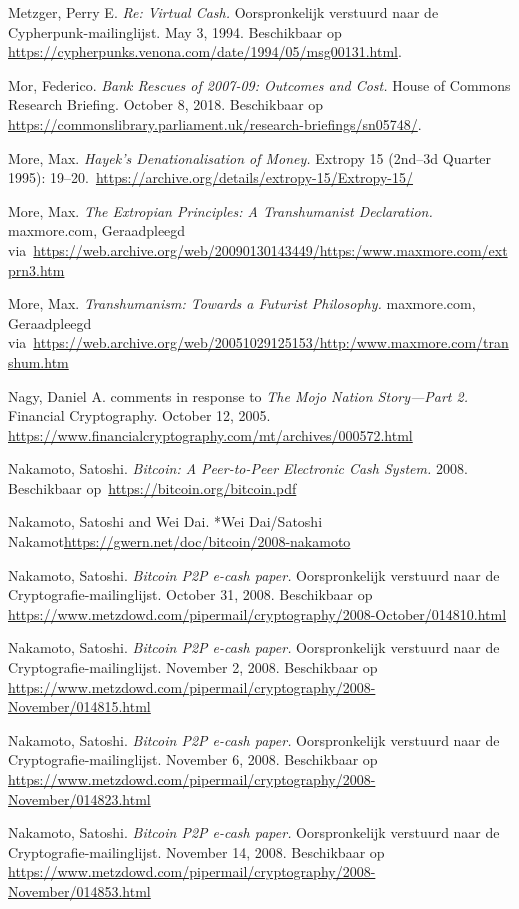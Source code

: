 \documentclass[
  a5paper,
  smalldemyvopaper,11pt,twoside,onecolumn,openright,extrafontsizes,
hidelinks]{memoir}
\begin{document}
Metzger, Perry E. \emph{Re: Virtual Cash.} Oorspronkelijk verstuurd naar
de Cypherpunk-mailinglijst. May 3, 1994. Beschikbaar op
\url{https://cypherpunks.venona.com/date/1994/05/msg00131.html}.

Mor, Federico. \emph{Bank Rescues of 2007-09: Outcomes and Cost.} House
of Commons Research Briefing. October 8, 2018. Beschikbaar op
\url{https://commonslibrary.parliament.uk/research-briefings/sn05748/}.

More, Max. \emph{Hayek's Denationalisation of Money.} Extropy 15
(2nd--3d Quarter 1995):
19--20.~\url{https://archive.org/details/extropy-15/Extropy-15/}

More, Max. \emph{The Extropian Principles: A Transhumanist Declaration.}
maxmore.com, Geraadpleegd
via~\url{https://web.archive.org/web/20090130143449/https:/www.maxmore.com/extprn3.htm}

More, Max. \emph{Transhumanism: Towards a Futurist Philosophy.}
maxmore.com, Geraadpleegd
via~\url{https://web.archive.org/web/20051029125153/http:/www.maxmore.com/transhum.htm}

Nagy, Daniel A. comments in response to \emph{The Mojo Nation
Story---Part 2.} Financial Cryptography. October 12, 2005.
\url{https://www.financialcryptography.com/mt/archives/000572.html}

Nakamoto, Satoshi. \emph{Bitcoin: A Peer-to-Peer Electronic Cash
System.} 2008. Beschikbaar op~\url{https://bitcoin.org/bitcoin.pdf}

Nakamoto, Satoshi and Wei Dai. *Wei Dai/Satoshi
Nakamot\url{https://gwern.net/doc/bitcoin/2008-nakamoto}

Nakamoto, Satoshi. \emph{Bitcoin P2P e-cash paper.} Oorspronkelijk
verstuurd naar de Cryptografie-mailinglijst. October 31, 2008.
Beschikbaar op
\url{https://www.metzdowd.com/pipermail/cryptography/2008-October/014810.html}

Nakamoto, Satoshi. \emph{Bitcoin P2P e-cash paper.} Oorspronkelijk
verstuurd naar de Cryptografie-mailinglijst. November 2, 2008.
Beschikbaar op
\url{https://www.metzdowd.com/pipermail/cryptography/2008-November/014815.html}

Nakamoto, Satoshi. \emph{Bitcoin P2P e-cash paper.} Oorspronkelijk
verstuurd naar de Cryptografie-mailinglijst. November 6, 2008.
Beschikbaar op
\url{https://www.metzdowd.com/pipermail/cryptography/2008-November/014823.html}

Nakamoto, Satoshi. \emph{Bitcoin P2P e-cash paper.} Oorspronkelijk
verstuurd naar de Cryptografie-mailinglijst. November 14, 2008.
Beschikbaar op
\url{https://www.metzdowd.com/pipermail/cryptography/2008-November/014853.html}
\end{document}
